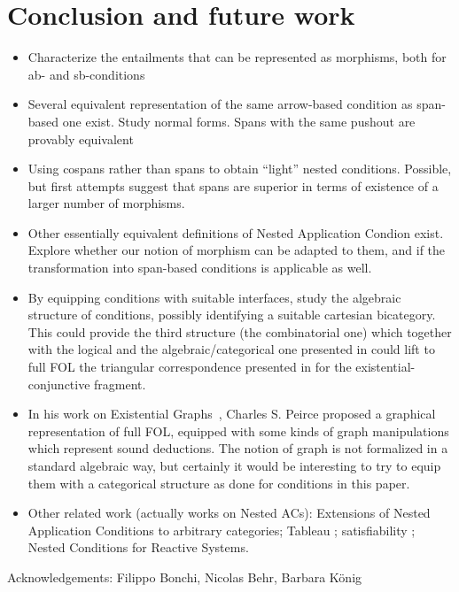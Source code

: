 \section{Conclusion and future work}

\begin{itemize}
    \item Characterize the entailments that can be represented as morphisms, both for ab- and sb-conditions
    \item Several equivalent representation of the same arrow-based condition as span-based one exist. Study normal forms. Spans with the same pushout are provably equivalent
\item Using cospans rather than spans to obtain ``light'' nested conditions. Possible, but first attempts suggest that spans are superior in terms of existence of a larger number of morphisms.
\item Other essentially equivalent definitions of Nested Application Condion exist. Explore whether our notion of morphism can be adapted to them, and if the transformation into span-based conditions is applicable as well.
\item By equipping conditions with suitable interfaces, study the algebraic structure of conditions, possibly identifying a suitable cartesian bicategory. This could provide the third structure (the combinatorial one) which together with the logical and the algebraic/categorical one presented in \cite{DBLP:journals/corr/abs-2404-18795} could lift to full FOL the triangular correspondence presented in \cite{DBLP:conf/csl/BonchiSS18} for the existential-conjunctive fragment.
\item In his work on Existential Graphs~\cite{roberts1973-the-existential-graphs-of-charles-s.-peirce}, Charles S. Peirce proposed a graphical representation of full FOL, equipped with some kinds of graph manipulations which represent sound deductions. The notion of graph is not formalized in a standard algebraic way, but certainly it would be interesting to try to equip them with a categorical structure as done for conditions in this paper.  
\item Other related work (actually works on Nested ACs): Extensions of Nested Application Conditions to arbitrary categories; Tableau%
; satisfiability%
; Nested Conditions for Reactive Systems. 
\end{itemize}
%
Acknowledgements: Filippo Bonchi, Nicolas Behr, Barbara König
